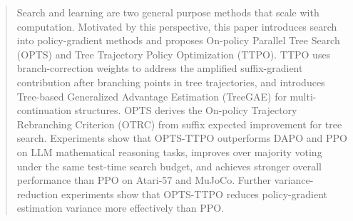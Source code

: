 \begin{abstract}
Search and learning are two general purpose methods that scale with computation. Motivated by this perspective, this paper introduces search into policy-gradient methods and proposes On-policy Parallel Tree Search (OPTS) and Tree Trajectory Policy Optimization (TTPO). TTPO uses branch-correction weights to address the amplified suffix-gradient contribution after branching points in tree trajectories, and introduces Tree-based Generalized Advantage Estimation (TreeGAE) for multi-continuation structures. OPTS derives the On-policy Trajectory Rebranching Criterion (OTRC) from suffix expected improvement for tree search. Experiments show that OPTS-TTPO outperforms DAPO and PPO on LLM mathematical reasoning tasks, improves over majority voting under the same test-time search budget, and achieves stronger overall performance than PPO on Atari-57 and MuJoCo. Further variance-reduction experiments show that OPTS-TTPO reduces policy-gradient estimation variance more effectively than PPO.
\end{abstract}

